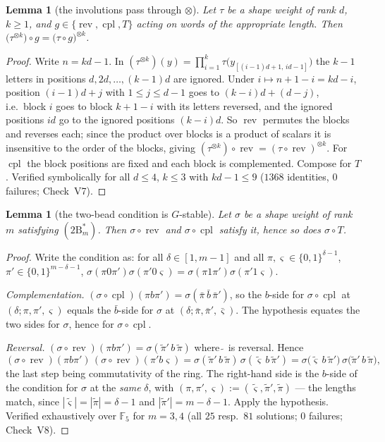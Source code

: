 \documentclass[11pt]{article}
\newtheorem{lemma}[theorem]{Lemma}
\theoremstyle{definition}
\theoremstyle{remark}
\newcommand{\rev}{\operatorname{rev}}
\newcommand{\cpl}{\operatorname{cpl}}
\begin{document}
\begin{lemma}[the involutions pass through $\otimes$]\label{lem:otimes}
Let $\tau$ be a shape weight of rank $d$, $k\ge1$, and $g\in\{\rev,\cpl,T\}$ acting on words
of the appropriate length.  Then
$\bigl(\tau^{\otimes k}\bigr)\circ g=\bigl(\tau\circ g\bigr)^{\otimes k}$.
\end{lemma}

\begin{proof}
Write $n=kd-1$.  In $(\tau^{\otimes k})(y)=\prod_{i=1}^{k}\tau\bigl(y_{[(i-1)d+1,\,id-1]}\bigr)$
the $k-1$ letters in positions $d,2d,\dots,(k-1)d$ are ignored.  Under
$i\mapsto n+1-i=kd-i$, position $(i-1)d+j$ with $1\le j\le d-1$ goes to $(k-i)d+(d-j)$, i.e.\
block $i$ goes to block $k+1-i$ with its letters reversed, and the ignored positions $id$ go to
the ignored positions $(k-i)d$.  So $\rev$ permutes the blocks and reverses each; since the
product over blocks is a product of scalars it is insensitive to the order of the blocks,
giving $(\tau^{\otimes k})\circ\rev=(\tau\circ\rev)^{\otimes k}$.  For $\cpl$ the block
positions are fixed and each block is complemented.  Compose for $T$.
Verified symbolically for all $d\le4$, $k\le3$ with $kd-1\le9$ ($1368$ identities, $0$
failures; Check~V7).
\end{proof}

\begin{lemma}[the two-bead condition is $G$-stable]\label{lem:2Bstable}
Let $\sigma$ be a shape weight of rank $m$ satisfying $(2\mathrm{B}^{*}_m)$.  Then
$\sigma\circ\rev$ and $\sigma\circ\cpl$ satisfy it, hence so does $\sigma\circ T$.
\end{lemma}

\begin{proof}
Write the condition as: for all $\delta\in[1,m-1]$ and all $\pi,\varsigma\in\{0,1\}^{\delta-1}$,
$\pi'\in\{0,1\}^{m-\delta-1}$,
$\sigma(\pi0\pi')\sigma(\pi'0\varsigma)=\sigma(\pi1\pi')\sigma(\pi'1\varsigma)$.

\emph{Complementation.}  $(\sigma\circ\cpl)(\pi b\pi')=\sigma(\bar\pi\,\bar b\,\bar\pi')$, so
the $b$-side for $\sigma\circ\cpl$ at $(\delta;\pi,\pi',\varsigma)$ equals the $\bar b$-side for
$\sigma$ at $(\delta;\bar\pi,\bar\pi',\bar\varsigma)$.  The hypothesis equates the two sides for
$\sigma$, hence for $\sigma\circ\cpl$.

\emph{Reversal.}  $(\sigma\circ\rev)(\pi b\pi')=\sigma(\tilde\pi'\,b\,\tilde\pi)$ where
$\tilde{\ }$ is reversal.  Hence
\[
  (\sigma\circ\rev)(\pi b\pi')\,(\sigma\circ\rev)(\pi' b\varsigma)
  =\sigma(\tilde\pi'\,b\,\tilde\pi)\,\sigma(\tilde\varsigma\,b\,\tilde\pi')
  =\sigma\bigl(\tilde\varsigma\,b\,\tilde\pi'\bigr)\,\sigma\bigl(\tilde\pi'\,b\,\tilde\pi\bigr),
\]
the last step being commutativity of the ring.  The right-hand side is the $b$-side of the
condition for $\sigma$ at the \emph{same} $\delta$, with
$(\pi,\pi',\varsigma):=(\tilde\varsigma,\tilde\pi',\tilde\pi)$ --- the lengths match, since
$|\tilde\varsigma|=|\tilde\pi|=\delta-1$ and $|\tilde\pi'|=m-\delta-1$.  Apply the hypothesis.
Verified exhaustively over $\mathbb F_5$ for $m=3,4$ (all $25$ resp.\ $81$ solutions; $0$
failures; Check~V8).
\end{proof}
\end{document}

